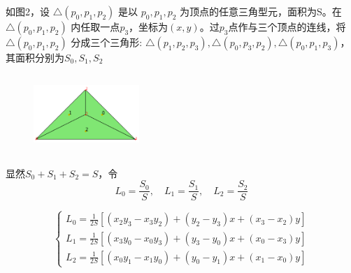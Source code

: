 \documentclass[UTF8,titlepage,twocolumn]{ctexart}
\begin{document}
如图2，设 $ \bigtriangleup(p_0,p_1,p_2) $ 是以 $p_0,p_1,p_2$ 为顶点的任意三角型元，面积为S。在 $ \bigtriangleup (p_0,p_1,p_2) $ 内任取一点$p_3$，坐标为$(x,y)$。过$p_3$点作与三个顶点的连线，将 $ \bigtriangleup(p_0,p_1,p_2) $ 分成三个三角形: $ \bigtriangleup(p_1,p_2,p_3), \bigtriangleup(p_0,p_3,p_2), \bigtriangleup(p_0,p_1,p_3) $，其面积分别为$S_0,S_1,S_2$

\begin{figure}[hbt]
	\centering
	\includegraphics[height=3cm,width=4cm]{../image/TriangleElement.png}
	\caption{}
	\label{SampleOfDatasets}
\end{figure}

显然$S_0 + S_1 + S_2 = S$，令
$$
	L_0 = \frac{S_0}{S}, \quad L_1 = \frac{S_1}{S}, \quad L_2 = \frac{S_2}{S}
$$
\par

$$
	\begin{cases}
		L_0 = \frac{1}{2S} [(x_2 y_3 - x_3 y_2) + (y_2 - y_3) x + (x_3 - x_2) y] \\
		L_1 = \frac{1}{2S} [(x_3 y_0 - x_0 y_3) + (y_3 - y_0) x + (x_0 - x_3) y] \\
		L_2 = \frac{1}{2S} [(x_0 y_1 - x_1 y_0) + (y_0 - y_1) x + (x_1 - x_0) y]
	\end{cases} 
$$
\end{document}
